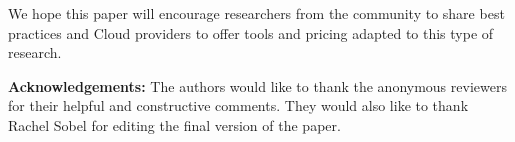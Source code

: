 \documentclass{acm_proc_article-sp}
\begin{document}
We hope this paper will encourage researchers from the community to share best practices and Cloud providers to offer tools and pricing adapted to this type of research.

{\bf Acknowledgements:} The authors would like to thank the anonymous reviewers for their helpful and constructive comments. They would also like to thank Rachel Sobel for editing the final version of the paper.


\vspace{2.5mm}

\end{document}
